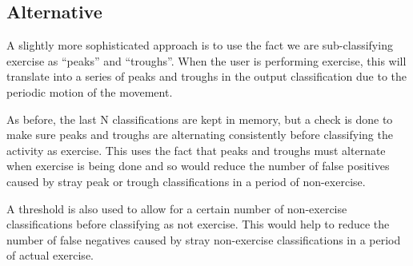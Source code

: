\subsection{Alternative}
A slightly more sophisticated approach is to use the fact we are sub-classifying exercise as “peaks” and “troughs”. When the user is performing exercise, this will translate into a series of peaks and troughs in the output classification due to the periodic motion of the movement.

As before, the last N classifications are kept in memory, but a check is done to make sure peaks and troughs are alternating consistently before classifying the activity as exercise. This uses the fact that peaks and troughs must alternate when exercise is being done and so would reduce the number of false positives caused by stray peak or trough classifications in a period of non-exercise. 

A threshold is also used to allow for a certain number of non-exercise classifications before classifying as not exercise. This would help to reduce the number of false negatives caused by stray non-exercise classifications in a period of actual exercise.

